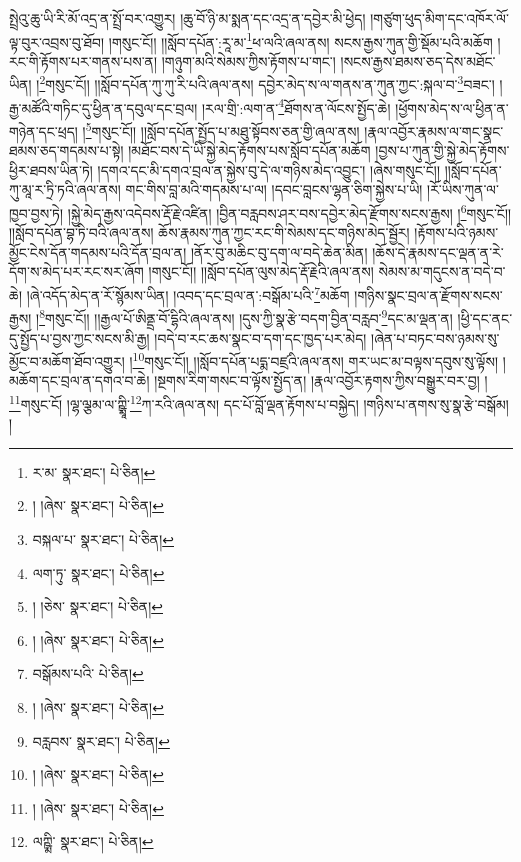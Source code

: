 སྤྲེའུ་ཆུ་ཡི་རི་མོ་འདྲ་ན་སྤྲོ་བར་འགྱུར། །ཆུ་བོ་ཉི་མ་སྨན་དང་འདྲ་ན་དབྱེར་མི་ཕྱེད། །གཙུག་ཕུད་མིག་དང་འཁོར་ལོ་ལྟ་བུར་འབྲས་བུ་ཐོབ། །གསུང་ངོ།། །།སློབ་དཔོན་:རཱ་མ་\footnote{ར་མ་  སྣར་ཐང་།  པེ་ཅིན། }ཕ་ལའི་ཞལ་ནས། སངས་རྒྱས་ཀུན་གྱི་སྡོམ་པའི་མཆོག །རང་གི་རྟོགས་པར་གནས་པས་ན། །གཉུག་མའི་སེམས་ཀྱིས་རྟོགས་པ་གང་། །སངས་རྒྱས་ཐམས་ཅད་དེས་མཐོང་ཡིན། །\footnote{། །ཞེས་  སྣར་ཐང་།  པེ་ཅིན། }གསུང་ངོ།། །།སློབ་དཔོན་ཀུ་ཀུ་རི་པའི་ཞལ་ནས། དབྱེར་མེད་ས་ལ་གནས་ན་ཀུན་ཀྱང་:སྐལ་བ་\footnote{བསྐལ་པ་  སྣར་ཐང་།  པེ་ཅིན། }བཟང་། །རྒྱ་མཚོའི་གཏིང་དུ་ཕྱིན་ན་དབུལ་དང་བྲལ། །རལ་གྲི་:ལག་ན་\footnote{ལག་ཏུ་  སྣར་ཐང་།  པེ་ཅིན། }ཐོགས་ན་ལོངས་སྤྱོད་ཆེ། །ཕྱོགས་མེད་ས་ལ་ཕྱིན་ན་གཉེན་དང་ཕྲད། །\footnote{། །ཅེས་  སྣར་ཐང་།  པེ་ཅིན། }གསུང་ངོ།། །།སློབ་དཔོན་སྤྱོད་པ་མཐུ་སྟོབས་ཅན་གྱི་ཞལ་ནས། །རྣལ་འབྱོར་རྣམས་ལ་གང་སྣང་ཐམས་ཅད་གདམས་པ་སྟེ། །མཐོང་བས་དེ་ཡི་སྐྱེ་མེད་རྟོགས་པས་སློབ་དཔོན་མཆོག །བྱས་པ་ཀུན་གྱི་སྐྱེ་མེད་རྟོགས་ཕྱིར་ཐབས་ཡིན་ཏེ། །དགའ་དང་མི་དགའ་བྲལ་ན་སྐྱེས་བུ་དེ་ལ་གཉིས་མེད་འབྱུང་། །ཞེས་གསུང་ངོ།། །།སློབ་དཔོན་ཀུ་མཱ་ར་ཏྲི་ཏའི་ཞལ་ནས། གང་གིས་བླ་མའི་གདམས་པ་ལ། །དབང་བླངས་ལྷན་ཅིག་སྐྱེས་པ་ཡི། །རོ་ཡིས་ཀུན་ལ་ཁྱབ་བྱས་ཏེ། །སྐྱེ་མེད་རྒྱས་འདེབས་རྡོ་རྗེ་འཛིན། །བྱིན་བརླབས་ཤར་བས་དབྱེར་མེད་རྫོགས་སངས་རྒྱས། །\footnote{། །ཞེས་  སྣར་ཐང་།  པེ་ཅིན། }གསུང་ངོ།། །།སློབ་དཔོན་བྷ་ཏི་བའི་ཞལ་ནས། ཆོས་རྣམས་ཀུན་ཀྱང་རང་གི་སེམས་དང་གཉིས་མེད་སྦྱོར། །རྟོགས་པའི་ཉམས་མྱོང་ངེས་དོན་གདམས་པའི་དོན་བྲལ་ན། །ནོར་བུ་མཆིང་བུ་དག་ལ་བདེ་ཆེན་མིན། །ཆོས་དེ་རྣམས་དང་ལྡན་ན་རེ་དོག་ས་མེད་པར་རང་སར་ཞོག །གསུང་ངོ།། །།སློབ་དཔོན་ལུས་མེད་རྡོ་རྗེའི་ཞལ་ནས། སེམས་མ་གདུངས་ན་བདེ་བ་ཆེ། །ཞེ་འདོད་མེད་ན་རོ་སྙོམས་ཡིན། །འབད་དང་བྲལ་ན་:བསྒོམ་པའི་\footnote{བསྒོམས་པའི་  པེ་ཅིན། }མཆོག །གཉིས་སྣང་བྲལ་ན་རྫོགས་སངས་རྒྱས། །\footnote{། །ཞེས་  སྣར་ཐང་།  པེ་ཅིན། }གསུང་ངོ།། །།རྒྱལ་པོ་ཨིནྡྲ་བོ་དྷིའི་ཞལ་ནས། །དུས་ཀྱི་སྣ་རྩེ་བདག་བྱིན་བརླབ་\footnote{བརླབས་  སྣར་ཐང་།  པེ་ཅིན། }དང་མ་ལྡན་ན། །ཕྱི་དང་ནང་དུ་སྤྱོད་པ་བྱས་ཀྱང་སངས་མི་རྒྱ། །བདེ་བ་རང་ཆས་སྣང་བ་དག་དང་ཁྱད་པར་མེད། །ཞེན་པ་བཏང་བས་ཉམས་སུ་མྱོང་བ་མཆོག་ཐོབ་འགྱུར། །\footnote{། །ཞེས་  སྣར་ཐང་།  པེ་ཅིན། }གསུང་ངོ།། །།སློབ་དཔོན་པདྨ་བཛྲའི་ཞལ་ནས། གར་ཡང་མ་བལྟས་དབུས་སུ་ལྟོས། །མཆོག་དང་བྲལ་ན་དགའ་བ་ཆེ། །སྔགས་རིག་གསང་བ་ལྟོས་སྤྱོད་ན། །རྣལ་འབྱོར་རྟགས་ཀྱིས་བསྒྱུར་བར་བྱ། །\footnote{། །ཞེས་  སྣར་ཐང་།  པེ་ཅིན། }གསུང་ངོ། །ལྷ་ལྕམ་ལ་ཀྵྨཱི་\footnote{ལཀྵྨི་  སྣར་ཐང་།  པེ་ཅིན། }ཀ་རའི་ཞལ་ནས། དང་པོ་བློ་ལྡན་རྟོགས་པ་བསྐྱེད། །གཉིས་པ་ནགས་སུ་སྣ་རྩེ་བསྒོམ། །

